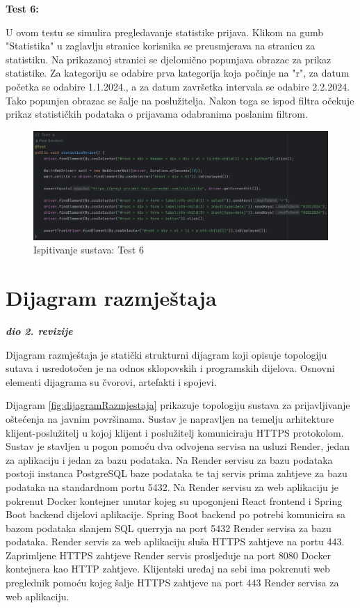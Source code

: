 		 	\textbf{Test 6:}
		 	
		 	U ovom testu se simulira pregledavanje statistike prijava. Klikom na gumb "Statistika" u zaglavlju stranice korisnika se preusmjerava na stranicu za statistiku.  Na prikazanoj stranici se djelomično popunjava obrazac za prikaz statistike. Za kategoriju se odabire prva kategorija koja počinje na "r", za datum početka se odabire 1.1.2024., a za datum završetka intervala se odabire 2.2.2024. Tako popunjen obrazac se šalje na poslužitelja. Nakon toga se ispod filtra očekuje prikaz statističkih podataka o prijavama odabranima poslanim filtrom.
		 	
		 	\begin{figure}[H]
		 		\includegraphics[width=\textwidth]{slike/SeleniumTest6.png} %
		 		\caption{Ispitivanje sustava: Test 6}
		 		\label{fig:SeleniumTest6} %
		 	\end{figure}
			
			\eject 
		
		
		\section{Dijagram razmještaja}
			
			\textbf{\textit{dio 2. revizije}}
			
			Dijagram razmještaja je statički strukturni dijagram koji opisuje topologiju sutava i usredotočen je na odnos sklopovskih i programskih dijelova. Osnovni elementi dijagrama su čvorovi, artefakti i spojevi.
			
			Dijagram \ref{fig:dijagramRazmjestaja} prikazuje topologiju sustava za prijavljivanje oštećenja na javnim površinama. Sustav je napravljen na temelju arhitekture klijent-poslužitelj u kojoj klijent i poslužitelj komuniciraju HTTPS protokolom. Sustav je stavljen u pogon pomoću dva odvojena servisa na usluzi Render, jedan za aplikaciju i jedan za bazu podataka. Na Render servisu za bazu podataka postoji instanca PostgreSQL baze podataka te taj servis prima zahtjeve za bazu podataka na standardnom portu 5432. Na Render servisu za web aplikaciju je pokrenut Docker kontejner unutar kojeg su upogonjeni React frontend i Spring Boot backend dijelovi aplikacije. Spring Boot backend po potrebi komunicira sa bazom podataka slanjem SQL querryja na port 5432 Render servisa za bazu podataka. Render servis za web aplikaciju sluša HTTPS zahtjeve na portu 443. Zaprimljene HTTPS zahtjeve Render servis prosljeđuje na port 8080 Docker kontejnera kao HTTP zahtjeve. Klijentski uređaj na sebi ima pokrenuti web preglednik pomoću kojeg šalje HTTPS zahtjeve na port 443 Render servisa za web aplikaciju.
			
